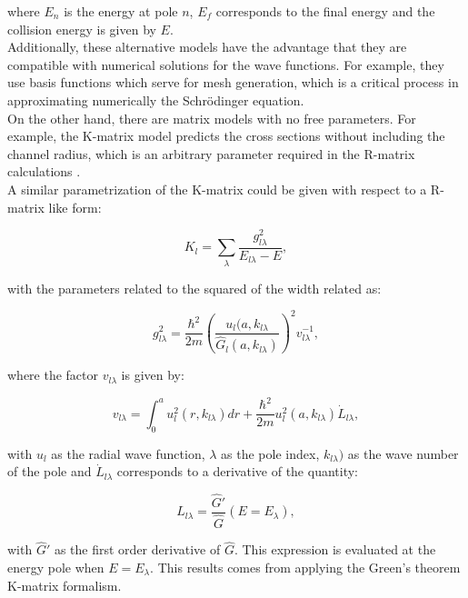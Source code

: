 \documentclass[openany]{book}
\begin{document}
where $E_n$ is the energy at pole $n$, $E_f$ corresponds to the final energy and the collision energy is given by $E$. \\

Additionally, these alternative models have the advantage that they are compatible with numerical solutions for the wave functions. For example, they use basis functions which serve for mesh generation, which is a critical process in approximating numerically the Schrödinger equation. \\

On the other hand, there are matrix models with no free parameters. For example, the K-matrix model predicts the cross sections without including the channel radius, which is an arbitrary parameter required in the R-matrix calculations \cite{humblet_1990}. \\

A similar parametrization of the K-matrix could be given with respect to a R-matrix like form: 

\begin{equation}\label{eq:rmatrix_kmatrix_series}
	K_l =  \sum_\lambda { \frac{g^2_{l\lambda}}{E_{l\lambda} - E}},
\end{equation}

with the parameters related to the squared of the width related as: 

\begin{equation}\label{eq:rmatrix_kmatrix_g}
	g^2_{l\lambda} = \frac{\hbar^2}{2m} \left(\frac{u_l(a, k_{l\lambda}}{\hat G_l (a, k_{
			l\lambda})}  \right)^2 v^{-1}_{l\lambda},
\end{equation}

where the factor $v_{l\lambda}$ is given by:

\begin{equation}\label{eq:rmatrix_kmatrix_v}
	v_{l\lambda} = \int_0^{a} u^2_l(r, k_{l\lambda}) dr  + \frac{\hbar^2}{2m} u^2_l(a,  k_{l\lambda}) \dot {L}_{l\lambda},
\end{equation}

with $u_l$ as the radial wave function, $\lambda$ as the pole index, $k_{l\lambda})$ as the wave number of the pole and $\dot {L}_{l\lambda}$ corresponds to a derivative of the quantity:

\begin{equation}\label{eq:rmatrix_kmatrix_L}
	L_{l\lambda} = \frac{\hat G'}{\hat G}(E = E_\lambda), 
\end{equation}

with $\hat G'$ as the first order derivative of $\hat G$. This expression is evaluated at the energy pole when $E = E_\lambda$. This results comes from applying the Green's theorem K-matrix formalism. \\
\end{document}
